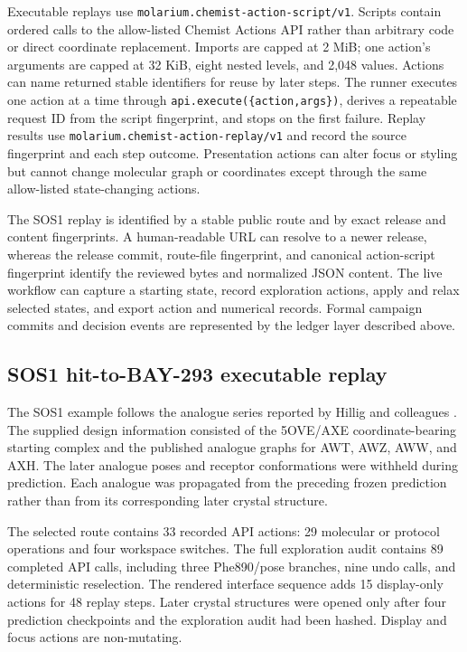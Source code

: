 \documentclass[11pt]{article}
\begin{document}
\begin{small}
Executable replays use \texttt{molarium.chemist-action-script/v1}. Scripts contain ordered calls to the allow-listed Chemist Actions API rather than arbitrary code or direct coordinate replacement. Imports are capped at 2 MiB; one action's arguments are capped at 32 KiB, eight nested levels, and 2,048 values. Actions can name returned stable identifiers for reuse by later steps. The runner executes one action at a time through \texttt{api.execute(\{action,args\})}, derives a repeatable request ID from the script fingerprint, and stops on the first failure. Replay results use \texttt{molarium.chemist-action-replay/v1} and record the source fingerprint and each step outcome. Presentation actions can alter focus or styling but cannot change molecular graph or coordinates except through the same allow-listed state-changing actions.

The SOS1 replay is identified by a stable public route and by exact release and content fingerprints. A human-readable URL can resolve to a newer release, whereas the release commit, route-file fingerprint, and canonical action-script fingerprint identify the reviewed bytes and normalized JSON content. The live workflow can capture a starting state, record exploration actions, apply and relax selected states, and export action and numerical records. Formal campaign commits and decision events are represented by the ledger layer described above.

\subsection{SOS1 hit-to-BAY-293 executable replay}

The SOS1 example follows the analogue series reported by Hillig and colleagues \citep{hillig2019sos1}. The supplied design information consisted of the 5OVE/AXE coordinate-bearing starting complex and the published analogue graphs for AWT, AWZ, AWW, and AXH. The later analogue poses and receptor conformations were withheld during prediction. Each analogue was propagated from the preceding frozen prediction rather than from its corresponding later crystal structure.

The selected route contains 33 recorded API actions: 29 molecular or protocol operations and four workspace switches. The full exploration audit contains 89 completed API calls, including three Phe890/pose branches, nine undo calls, and deterministic reselection. The rendered interface sequence adds 15 display-only actions for 48 replay steps. Later crystal structures were opened only after four prediction checkpoints and the exploration audit had been hashed. Display and focus actions are non-mutating.


\end{small}
\end{document}
